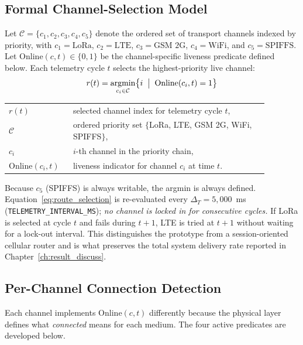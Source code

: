 \subsection{Formal Channel-Selection Model}
\label{sec:comm_channel_selection}

Let $\mathcal{C} = \{c_1, c_2, c_3, c_4, c_5\}$ denote the ordered set of transport channels indexed by priority, with $c_1 = \text{LoRa}$, $c_2 = \text{LTE}$, $c_3 = \text{GSM~2G}$, $c_4 = \text{WiFi}$, and $c_5 = \text{SPIFFS}$. Let $\mathrm{Online}(c, t) \in \{0, 1\}$ be the channel-specific liveness predicate defined below. Each telemetry cycle $t$ selects the highest-priority live channel:
\begin{equation}
r(t) = \operatorname*{argmin}_{c_i \in \mathcal{C}} \bigl\{ i \;\bigm|\; \mathrm{Online}(c_i, t) = 1 \bigr\}
\label{eq:route_selection}
\end{equation}
\noindent\begin{tabular}{@{}p{0.20\linewidth}@{\quad}p{0.68\linewidth}@{}}
$r(t)$ & selected channel index for telemetry cycle $t$, \\
$\mathcal{C}$ & ordered priority set $\{$LoRa, LTE, GSM 2G, WiFi, SPIFFS$\}$, \\
$c_i$ & $i$-th channel in the priority chain, \\
$\mathrm{Online}(c_i,t)$ & liveness indicator for channel $c_i$ at time $t$.
\end{tabular}

\vspace{0.5em}
Because $c_5$ (SPIFFS) is always writable, the argmin is always defined. Equation~\ref{eq:route_selection} is re-evaluated every $\Delta_T = 5{,}000$~ms (\texttt{TELEMETRY\_INTERVAL\_MS}); \emph{no channel is locked in for consecutive cycles.} If LoRa is selected at cycle $t$ and fails during $t+1$, LTE is tried at $t+1$ without waiting for a lock-out interval. This distinguishes the prototype from a session-oriented cellular router and is what preserves the total system delivery rate reported in Chapter~\ref{ch:result_discuss}.

\subsection{Per-Channel Connection Detection}
\label{sec:comm_online_predicates}

Each channel implements $\mathrm{Online}(c, t)$ differently because the physical layer defines what \emph{connected} means for each medium. The four active predicates are developed below.

